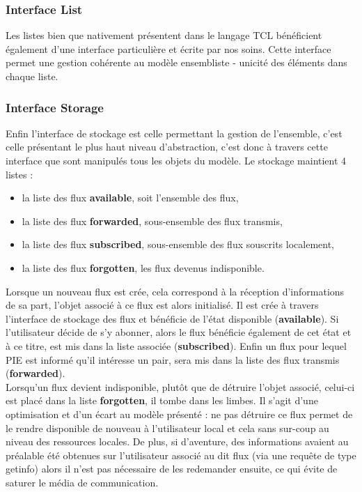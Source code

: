 \subsubsection{Interface List}

Les listes bien que nativement présentent dans le langage TCL bénéficient également
d'une interface particulière et écrite par nos soins. Cette interface permet une gestion
cohérente au modèle ensembliste - unicité des éléments dans chaque liste.

\subsubsection{Interface Storage}

Enfin l'interface de stockage est celle permettant la gestion de l'ensemble, c'est 
celle présentant le plus haut niveau d'abstraction, c'est donc à travers cette interface
que sont manipulés tous les objets du modèle. Le stockage maintient 4 listes :\\

\begin{itemize}
	\item la liste des flux \textbf{available}, soit l'ensemble des flux,
	\item la liste des flux \textbf{forwarded}, sous-ensemble des flux transmis,
	\item la liste des flux \textbf{subscribed}, sous-ensemble des flux souscrits localement,
	\item la liste des flux \textbf{forgotten}, les flux devenus indisponible. \\
\end{itemize}

Lorsque un nouveau flux est crée, cela correspond à la réception d'informations de sa part, l'objet
associé à ce flux est alors initialisé. Il est crée à travers l'interface de stockage des flux et
bénéficie de l'état disponible (\textbf{available}). Si l'utilisateur décide de s'y abonner, alors
le flux bénéficie également de cet état et à ce titre, est mis dans la liste associée (\textbf{subscribed}).
Enfin un flux pour lequel PIE est informé qu'il intéresse un pair, sera mis dans la liste des flux
transmis (\textbf{forwarded}). \\

Lorsqu'un flux devient indisponible, plutôt que de détruire l'objet associé, celui-ci est placé dans la
liste \textbf{forgotten}, il tombe dans les limbes. Il s'agit d'une optimisation et d'un écart au modèle
présenté : ne pas détruire ce flux permet de le rendre disponible de nouveau à l'utilisateur local et
cela sans sur-coup au niveau des ressources locales. De plus, si d'aventure, des informations avaient
au préalable été obtenues sur l'utilisateur associé au dit flux (via une requête de type getinfo) alors
il n'est pas nécessaire de les redemander ensuite, ce qui évite de saturer le média de communication. \\

